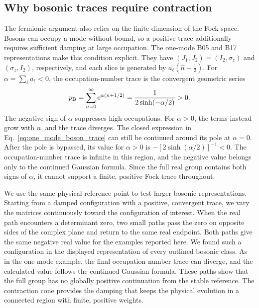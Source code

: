 \documentclass[onecolumn,aps,prb,amsmath,amssymb,superscriptaddress,longbibliography,floatfix]{revtex4-2}
\newcommand{\ee}{\mathrm{e}}
\begin{document}
\subsection{Why bosonic traces require contraction}

The fermionic argument also relies on the finite dimension of the Fock space.
Bosons can occupy a mode without bound, so a positive trace additionally
requires sufficient damping at large occupation.  The one-mode B05 and B17
representations make this condition explicit.  They have
\((J_1,J_2)=(I_2,\sigma_z)\) and \((\sigma_z,I_2)\), respectively, and each
slice is generated by \(a_\ell(\hat n+\frac12)\).  For
\(\alpha=\sum_\ell a_\ell<0\), the occupation-number trace is the convergent
geometric series
\begin{equation}
    p_{\rm B}
    =\sum_{n=0}^{\infty}\ee^{\alpha(n+1/2)}
    =\frac{1}{2\sinh(-\alpha/2)}>0.
    \label{eq:one_mode_boson_trace}
\end{equation}
The negative sign of \(\alpha\) suppresses high occupations.  For
\(\alpha>0\), the terms instead grow with \(n\), and the trace diverges.  The
closed expression in Eq.~\eqref{eq:one_mode_boson_trace} can still be continued
around its pole at \(\alpha=0\).  After the pole is bypassed, its value for
\(\alpha>0\) is \(-[2\sinh(\alpha/2)]^{-1}<0\).  The occupation-number trace
is infinite in this region, and the negative value belongs only to the
continued Gaussian formula.  Since the full real group contains both signs of
\(\alpha\), it cannot support a finite, positive Fock trace throughout.

We use the same physical reference point to test larger bosonic
representations.  Starting from a damped configuration with a positive,
convergent trace, we vary the matrices continuously toward the configuration of
interest.  When the real path encounters a determinant zero, two small paths
pass the zero on opposite sides of the complex plane and return to the same
real endpoint.  Both paths give the same negative real value for the examples
reported here.  We found such a configuration in the displayed representation
of every outlined bosonic class.  As in the one-mode example, the final
occupation-number trace can diverge, and the calculated value follows the
continued Gaussian formula.  These paths show that the full group has no
globally positive continuation from the stable reference.  The contraction
cone provides the damping that keeps the physical evolution in a connected
region with finite, positive weights.
\end{document}
